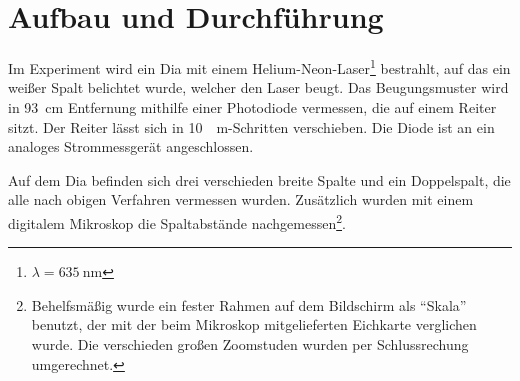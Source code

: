 \newpage
\section{Aufbau und Durchführung}\label{sec:aufbau-und-durchfuehrung}

Im Experiment wird ein Dia mit einem Helium-Neon-Laser\footnote{$\lambda = \SI{635}{\nano\m}$} bestrahlt, auf das ein weißer Spalt belichtet wurde, welcher den Laser beugt. Das Beugungsmuster wird in \SI{93}{\cm} Entfernung mithilfe einer Photodiode vermessen, die auf einem Reiter sitzt. Der Reiter lässt sich in \SI{10}{\mu\m}-Schritten verschieben. Die Diode ist an ein analoges Strommessgerät angeschlossen.

Auf dem Dia befinden sich drei verschieden breite Spalte und ein Doppelspalt, die alle nach obigen Verfahren vermessen wurden. Zusätzlich wurden mit einem digitalem Mikroskop die Spaltabstände nachgemessen\footnote{Behelfsmäßig wurde ein fester Rahmen auf dem Bildschirm als ``Skala'' benutzt, der mit der beim Mikroskop mitgelieferten Eichkarte verglichen wurde. Die verschieden großen Zoomstuden wurden per Schlussrechung umgerechnet.}.

